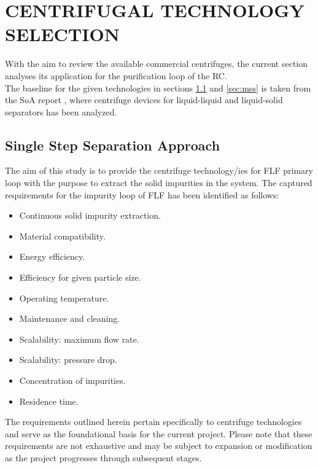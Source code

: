 \newpage

\section{CENTRIFUGAL TECHNOLOGY SELECTION} \label{sec:eng}%
With the aim to review the available commercial centrifuges, the current section analyses its application for the purification loop of the RC. \\

\noindent The baseline for the given technologies in sections \ref{sec:sss} and \ref{sec:mss} is taken from the SoA report \cite{SoA}, where centrifuge devices for liquid-liquid and liquid-solid separators has been analyzed. 

\subsection{Single Step Separation Approach}\label{sec:sss}
The aim of this study is to provide the centrifuge technology/ies for FLF primary loop with the purpose to extract the solid impurities in the system. The captured requirements for the impurity loop of FLF has been identified as follows:

\begin{itemize}
	\item Continuous solid impurity extraction.
	\item Material compatibility.
	\item Energy efficiency.
	\item Efficiency for given particle size. 
	\item Operating temperature.
	\item Maintenance and cleaning.
	\item Scalability: maximum flow rate.
	\item Scalability: pressure drop.
	\item Concentration of impurities. 
	\item Residence time.
\end{itemize}

\begin{tcolorbox}[colback=gray!5!white,colframe=gray!75!black,title=Disclaimer]
	The requirements outlined herein pertain specifically to centrifuge technologies and serve as the foundational basis for the current project. Please note that these requirements are not exhaustive and may be subject to expansion or modification as the project progresses through subsequent stages. 
\end{tcolorbox}

